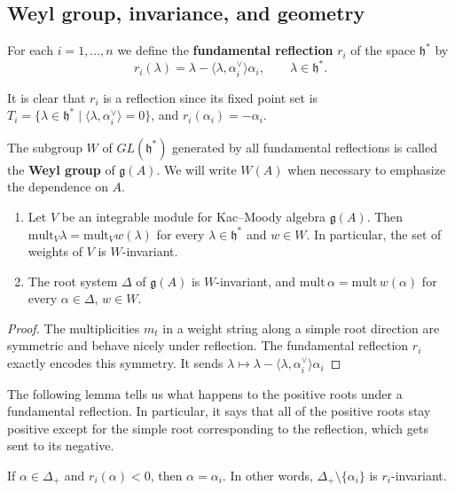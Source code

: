 \documentclass[12pt]{article}
\begin{document}
\subsection{Weyl group, invariance, and geometry}
\begin{definition}
    For each $i=1,\dots,n$ we define the
    \textbf{fundamental reflection} $r_i$ of the space $\mathfrak{h}^*$ by
    \[
        r_i(\lambda) = \lambda - \langle \lambda,\alpha_i^\vee\rangle \alpha_i,
        \qquad \lambda \in \mathfrak{h}^*.
    \]

    It is clear that $r_i$ is a reflection since its fixed point set is  $T_i = \{ \lambda \in \mathfrak{h}^* \mid \langle \lambda,\alpha_i^\vee\rangle=0\}$,
    and $r_i(\alpha_i) = -\alpha_i$.

    The subgroup $W$ of $GL(\mathfrak{h}^*)$ generated by all fundamental reflections
    is called the \textbf{Weyl group} of $\mathfrak{g}(A)$. We will write $W(A)$ when
    necessary to emphasize the dependence on $A$.
\end{definition}

\begin{proposition}\label{prop:Weyl-invariance}
    \leavevmode
    \begin{enumerate}[label=(\alph*)]
        \item Let $V$ be an integrable module for Kac--Moody algebra $\mathfrak{g}(A)$.
              Then $\mathrm{mult}_V \lambda = \mathrm{mult}_V w(\lambda)$ for every
              $\lambda \in \mathfrak{h}^*$ and $w\in W$. In particular, the set of weights of $V$
              is $W$-invariant.

        \item The root system $\Delta$ of $\mathfrak{g}(A)$ is $W$-invariant, and
              $\mathrm{mult}\,\alpha = \mathrm{mult}\,w(\alpha)$ for every
              $\alpha \in \Delta$, $w\in W$.
    \end{enumerate}
\end{proposition}

\begin{proof}The multiplicities $m_t$ in a weight string along a simple root direction are symmetric and behave nicely under reflection. The fundamental reflection $r_i$ exactly encodes this symmetry. It sends
    $\lambda \mapsto \lambda - \langle \lambda,\alpha_i^\vee \rangle \alpha_i$
\end{proof}

The following lemma tells us what happens to the positive roots under a fundamental reflection. In particular, it says that all of the positive roots stay positive except for the simple root corresponding to the reflection, which gets sent to its negative.
\begin{lemma}\label{lem:3.7}
    If $\alpha \in \Delta_+$ and $r_i(\alpha) < 0$, then $\alpha = \alpha_i$.
    In other words, $\Delta_+ \setminus \{\alpha_i\}$ is $r_i$-invariant.
\end{lemma}
\end{document}
